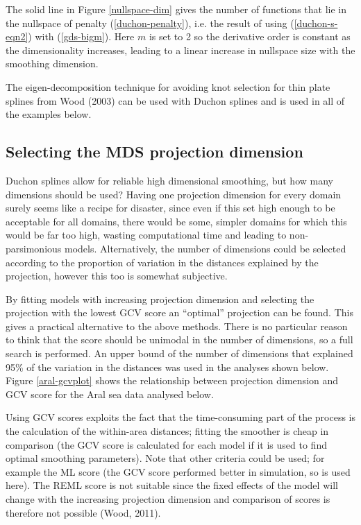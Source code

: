 \documentclass[useAMS, referee]{biom}
\begin{document}
The solid line in Figure \ref{nullspace-dim} gives the number of functions that lie in the nullspace of penalty (\ref{duchon-penalty}), i.e. the result of using (\ref{duchon-s-eqn2}) with (\ref{gds-bigm}). Here $m$ is set to 2 so the derivative order is constant as the dimensionality increases, leading to a linear increase in nullspace size with the smoothing dimension.

The eigen-decomposition technique for avoiding knot selection for thin plate splines from Wood (2003) can be used with Duchon splines and is used in all of the examples below.

\subsection{Selecting the MDS projection dimension}
\label{s:mdsdimselect}

Duchon splines allow for reliable high dimensional smoothing, but how many dimensions should be used? Having one projection dimension for every domain surely seems like a recipe for disaster, since even if this set high enough to be acceptable for all domains, there would be some, simpler domains for which this would be far too high, wasting computational time and leading to non-parsimonious models. Alternatively, the number of dimensions could be selected according to the proportion of variation in the distances explained by the projection, however this too is somewhat subjective.

By fitting models with increasing projection dimension and selecting the projection with the lowest GCV score an ``optimal'' projection can be found. This gives a practical alternative to the above methods. There is no particular reason to think that the score should be unimodal in the number of dimensions, so a full search is performed. An upper bound of the number of dimensions that explained 95\% of the variation in the distances was used in the analyses shown below. Figure \ref{aral-gcvplot} shows the relationship between projection dimension and GCV score for the Aral sea data analysed below.

Using GCV scores exploits the fact that the time-consuming part of the process is the calculation of the within-area distances; fitting the smoother is cheap in comparison (the GCV score is calculated for each model if it is used to find optimal smoothing parameters). Note that other criteria could be used; for example the ML score (the GCV score performed better in simulation, so is used here). The REML score is not suitable since the fixed effects of the model will change with the increasing projection dimension and comparison of scores is therefore not possible (Wood, 2011). 
\end{document}
